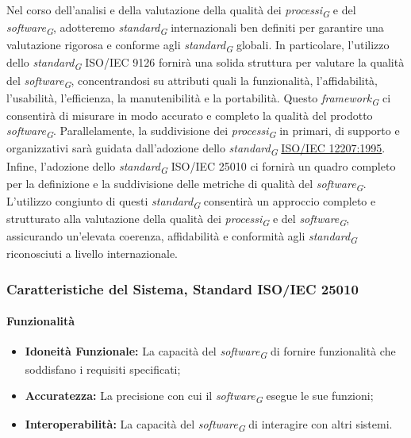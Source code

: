 Nel corso dell'analisi e della valutazione della qualità dei \textit{processi}\textsubscript{\textit{G}} e del \textit{software}\textsubscript{\textit{G}}, adotteremo \textit{standard}\textsubscript{\textit{G}} internazionali ben definiti per garantire una valutazione rigorosa e conforme agli \textit{standard}\textsubscript{\textit{G}} globali. In particolare, l'utilizzo dello \textit{standard}\textsubscript{\textit{G}} ISO/IEC 9126 fornirà una solida struttura per valutare la qualità del \textit{software}\textsubscript{\textit{G}}, concentrandosi su attributi quali la funzionalità, l'affidabilità, l'usabilità, l'efficienza, la manutenibilità e la portabilità. Questo \textit{framework}\textsubscript{\textit{G}} ci consentirà di misurare in modo accurato e completo la qualità del prodotto \textit{software}\textsubscript{\textit{G}}. Parallelamente, la suddivisione dei \textit{processi}\textsubscript{\textit{G}} in primari, di supporto e organizzativi sarà guidata dall'adozione dello \textit{standard}\textsubscript{\textit{G}} \href{https://www.math.unipd.it/~tullio/IS-1/2009/Approfondimenti/ISO_12207-1995.pdf}{ISO/IEC 12207:1995}. Infine, l'adozione dello \textit{standard}\textsubscript{\textit{G}} ISO/IEC 25010 ci fornirà un quadro completo per la definizione e la suddivisione delle metriche di qualità del \textit{software}\textsubscript{\textit{G}}.
L'utilizzo congiunto di questi \textit{standard}\textsubscript{\textit{G}} consentirà un approccio completo e strutturato alla valutazione della qualità dei \textit{processi}\textsubscript{\textit{G}} e del \textit{software}\textsubscript{\textit{G}}, assicurando un'elevata coerenza, affidabilità e conformità agli \textit{standard}\textsubscript{\textit{G}} riconosciuti a livello internazionale.

\subsubsection{Caratteristiche del Sistema, Standard ISO/IEC 25010}

\paragraph{Funzionalità}
\begin{itemize}
    \item \textbf{Idoneità Funzionale:} La capacità del \textit{software}\textsubscript{\textit{G}} di fornire funzionalità che soddisfano i requisiti specificati;
    \item \textbf{Accuratezza:} La precisione con cui il \textit{software}\textsubscript{\textit{G}} esegue le sue funzioni;
    \item \textbf{Interoperabilità:} La capacità del \textit{software}\textsubscript{\textit{G}} di interagire con altri sistemi.
\end{itemize}

